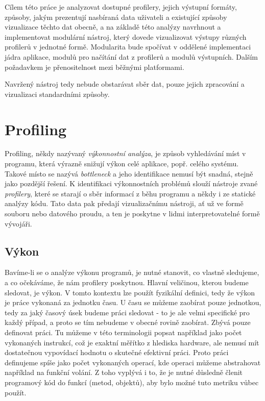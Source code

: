 \documentclass[czech,BP]{thesiskiv}
\begin{document}
Cílem této práce je analyzovat dostupné profilery, jejich výstupní formáty, způsoby, jakým prezentují nasbíraná data uživateli a existující způsoby vizualizace těchto dat obecně, a na základě této analýzy navrhnout a implementovat modulární nástroj, který dovede vizualizovat výstupy různých profilerů v jednotné formě. Modularita bude spočívat v oddělené implementaci jádra aplikace, modulů pro načítání dat z profilerů a modulů výstupních. Dalším požadavkem je přenositelnost mezi běžnými platformami.

Navržený nástroj tedy nebude obstarávat sběr dat, pouze jejich zpracování a vizualizaci standardními způsoby.

\newpage

\chapter{Profiling}

Profiling, někdy nazývaný \emph{výkonnostní analýza}, je způsob vyhledávání míst v programu, která výrazně snižují výkon celé aplikace, popř. celého systému. Takové místo se nazývá \emph{bottleneck} a jeho identifikace nemusí být snadná, stejně jako pozdější řešení. K identifikaci výkonnostních problémů slouží nástroje zvané \emph{profilery}, které se starají o sběr informací z běhu programu a někdy i ze statické analýzy kódu. Tato data pak předají vizualizačnímu nástroji, ať už ve formě souboru nebo datového proudu, a ten je poskytne v lidmi interpretovatelné formě vývojáři.

\section{Výkon}

Bavíme-li se o analýze výkonu programů, je nutné stanovit, co vlastně sledujeme, a co očekáváme, že nám profilery poskytnou. Hlavní veličinou, kterou budeme sledovat, je výkon. V tomto kontextu lze použít fyzikální definici, tedy že výkon je práce vykonaná za jednotku času. U času se můžeme zaobírat pouze jednotkou, tedy za jaký časový úsek budeme práci sledovat - to je ale velmi specifické pro každý případ, a proto se tím nebudeme v obecné rovině zaobírat. Zbývá pouze definovat práci. Tu můžeme v této terminologii popsat například jako počet vykonaných instrukcí, což je exaktní měřítko z hlediska hardware, ale nemusí mít dostatečnou vypovídací hodnotu o skutečné efektivní práci. Proto práci definujeme spíše jako počet vykonaných operací, kde operaci můžeme abstrahovat například na funkční volání. Z toho vyplývá i to, že je nutné důsledně členit programový kód do funkcí (metod, objektů), aby bylo možné tuto metriku vůbec použít.
\end{document}
